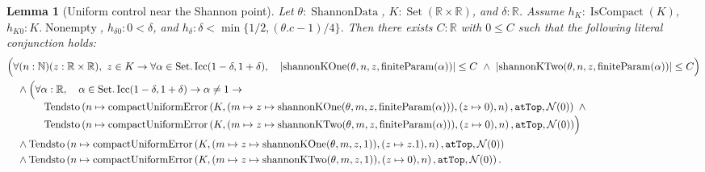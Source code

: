 \documentclass[9pt]{extarticle}
\newtheorem{lemma}{Lemma}[section]
\theoremstyle{definition}
\theoremstyle{remark}
\newcommand{\R}{\mathbb R}
\newcommand{\N}{\mathbb N}
\newcommand{\abs}[1]{\left\lvert #1\right\rvert}
\begin{document}
\begin{lemma}[Uniform control near the Shannon point]
\label{lem:shannon-neighbourhood}
Let $\theta:\operatorname{ShannonData}$,
$K:\operatorname{Set}(\R\times\R)$, and $\delta:\R$.  Assume
$h_K:\operatorname{IsCompact}(K)$,
$h_{K0}:K.\operatorname{Nonempty}$,
$h_{\delta0}:0<\delta$, and
$h_\delta:\delta<\min\{1/2,(\theta.c-1)/4\}$.  Then there exists $C:\R$ with
$0\leq C$ such that the following literal conjunction holds:
\begin{align*}
&\Bigl(\forall(n:\N)(z:\R\times\R),\ z\in K\to
 \forall\alpha\in\operatorname{Set.Icc}(1-\delta,1+\delta),\quad
 \abs{\operatorname{shannonKOne}
  (\theta,n,z,\operatorname{finiteParam}(\alpha))}\leq C\ 
 \wedge\
 \abs{\operatorname{shannonKTwo}
  (\theta,n,z,\operatorname{finiteParam}(\alpha))}\leq C\Bigr)\\
&\quad\wedge\Bigl(\forall\alpha:\R,\quad
 \alpha\in\operatorname{Set.Icc}(1-\delta,1+\delta)\to\alpha\neq1\to\\[-2pt]
&\hspace{12mm}
 \operatorname{Tendsto}
  \left(n\mapsto\operatorname{compactUniformError}
   \left(K,(m\mapsto z\mapsto\operatorname{shannonKOne}
     (\theta,m,z,\operatorname{finiteParam}(\alpha))),
    (z\mapsto0),n\right),\texttt{atTop},\mathcal N(0)\right)\ 
 \wedge\\[-2pt]
&\hspace{12mm}
 \operatorname{Tendsto}
  \left(n\mapsto\operatorname{compactUniformError}
   \left(K,(m\mapsto z\mapsto\operatorname{shannonKTwo}
     (\theta,m,z,\operatorname{finiteParam}(\alpha))),
    (z\mapsto0),n\right),\texttt{atTop},\mathcal N(0)\right)\Bigr)\\
&\quad\wedge
 \operatorname{Tendsto}
  \left(n\mapsto\operatorname{compactUniformError}
   \left(K,(m\mapsto z\mapsto\operatorname{shannonKOne}(\theta,m,z,1)),
    (z\mapsto z.1),n\right),\texttt{atTop},\mathcal N(0)\right)\\
&\quad\wedge
 \operatorname{Tendsto}
  \left(n\mapsto\operatorname{compactUniformError}
   \left(K,(m\mapsto z\mapsto\operatorname{shannonKTwo}(\theta,m,z,1)),
    (z\mapsto0),n\right),\texttt{atTop},\mathcal N(0)\right).
\end{align*}
\end{lemma}
\end{document}
